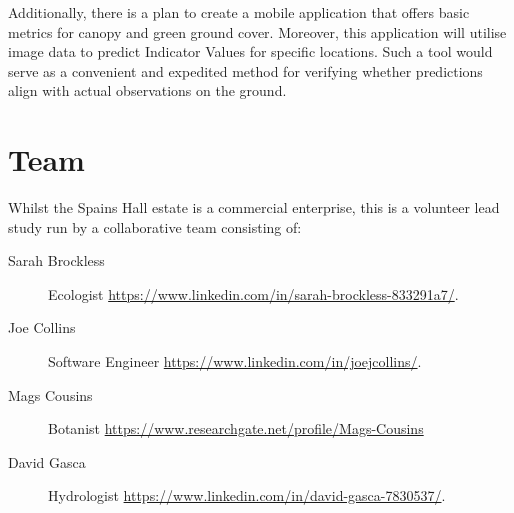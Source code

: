 \documentclass{roles}
\begin{document}
Additionally, there is a plan to create a mobile application that offers basic metrics
for canopy and green ground cover.
Moreover,
this application will utilise image data to predict Indicator Values for specific locations.
Such a tool would serve as a convenient and expedited method
for verifying whether predictions align with actual observations on the ground.

\section*{Team}

Whilst the Spains Hall estate is a commercial enterprise,
this is a volunteer lead study
run by a collaborative team consisting of:

\begin{description}
    \item[Sarah Brockless] Ecologist \href{https://www.linkedin.com/in/sarah-brockless-833291a7/}{https://www.linkedin.com/in/sarah-brockless-833291a7/}.
    \item[Joe Collins] Software Engineer \href{https://www.linkedin.com/in/joejcollins/}{https://www.linkedin.com/in/joejcollins/}.
    \item[Mags Cousins] Botanist \href{https://www.researchgate.net/profile/Mags-Cousins}{https://www.researchgate.net/profile/Mags-Cousins}
    \item[David Gasca] Hydrologist \href{https://www.linkedin.com/in/david-gasca-7830537/}{https://www.linkedin.com/in/david-gasca-7830537/}.
\end{description}
\end{document}
